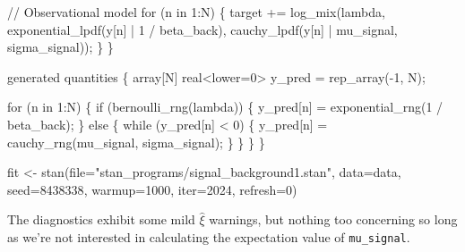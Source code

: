\documentclass[
  letterpaper,
  DIV=11,
  numbers=noendperiod]{scrartcl}
\newenvironment{Shaded}{\begin{snugshade}}{\end{snugshade}}
\newcommand{\AttributeTok}[1]{\textcolor[rgb]{0.40,0.45,0.13}{#1}}
\newcommand{\CommentTok}[1]{\textcolor[rgb]{0.37,0.37,0.37}{#1}}
\newcommand{\ControlFlowTok}[1]{\textcolor[rgb]{0.00,0.23,0.31}{#1}}
\newcommand{\DataTypeTok}[1]{\textcolor[rgb]{0.68,0.00,0.00}{#1}}
\newcommand{\DecValTok}[1]{\textcolor[rgb]{0.68,0.00,0.00}{#1}}
\newcommand{\FunctionTok}[1]{\textcolor[rgb]{0.28,0.35,0.67}{#1}}
\newcommand{\KeywordTok}[1]{\textcolor[rgb]{0.00,0.23,0.31}{#1}}
\newcommand{\NormalTok}[1]{\textcolor[rgb]{0.00,0.23,0.31}{#1}}
\newcommand{\OtherTok}[1]{\textcolor[rgb]{0.00,0.23,0.31}{#1}}
\newcommand{\SpecialCharTok}[1]{\textcolor[rgb]{0.37,0.37,0.37}{#1}}
\newcommand{\StringTok}[1]{\textcolor[rgb]{0.13,0.47,0.30}{#1}}
\begin{document}
\begin{codelisting}
\begin{Shaded}
\begin{Highlighting}[]
  \CommentTok{// Observational model}
  \ControlFlowTok{for}\NormalTok{ (n }\ControlFlowTok{in} \DecValTok{1}\NormalTok{:N) \{}
    \KeywordTok{target +=}\NormalTok{ log\_mix(lambda,}
\NormalTok{                      exponential\_lpdf(y[n] | }\DecValTok{1}\NormalTok{ / beta\_back),}
\NormalTok{                      cauchy\_lpdf(y[n] | mu\_signal, sigma\_signal));}
\NormalTok{  \}}
\NormalTok{\}}

\KeywordTok{generated quantities}\NormalTok{ \{}
  \DataTypeTok{array}\NormalTok{[N] }\DataTypeTok{real}\NormalTok{\textless{}}\KeywordTok{lower}\NormalTok{=}\DecValTok{0}\NormalTok{\textgreater{} y\_pred = rep\_array({-}}\DecValTok{1}\NormalTok{, N);}

  \ControlFlowTok{for}\NormalTok{ (n }\ControlFlowTok{in} \DecValTok{1}\NormalTok{:N) \{}
    \ControlFlowTok{if}\NormalTok{ (bernoulli\_rng(lambda)) \{}
\NormalTok{      y\_pred[n] = exponential\_rng(}\DecValTok{1}\NormalTok{ / beta\_back);}
\NormalTok{    \} }\ControlFlowTok{else}\NormalTok{ \{}
      \ControlFlowTok{while}\NormalTok{ (y\_pred[n] \textless{} }\DecValTok{0}\NormalTok{) \{}
\NormalTok{        y\_pred[n] = cauchy\_rng(mu\_signal, sigma\_signal);}
\NormalTok{      \}}
\NormalTok{    \}}
\NormalTok{  \}}
\NormalTok{\}}
\end{Highlighting}
\end{Shaded}

\end{codelisting}

\begin{Shaded}
\begin{Highlighting}[]
\NormalTok{fit }\OtherTok{\textless{}{-}} \FunctionTok{stan}\NormalTok{(}\AttributeTok{file=}\StringTok{"stan\_programs/signal\_background1.stan"}\NormalTok{,}
            \AttributeTok{data=}\NormalTok{data, }\AttributeTok{seed=}\DecValTok{8438338}\NormalTok{,}
            \AttributeTok{warmup=}\DecValTok{1000}\NormalTok{, }\AttributeTok{iter=}\DecValTok{2024}\NormalTok{, }\AttributeTok{refresh=}\DecValTok{0}\NormalTok{)}
\end{Highlighting}
\end{Shaded}

The diagnostics exhibit some mild \(\hat{\xi}\) warnings, but nothing
too concerning so long as we're not interested in calculating the
expectation value of \texttt{mu\_signal}.

\begin{Shaded}
\end{Shaded}
\end{document}
